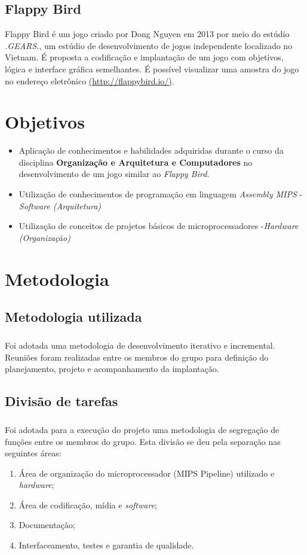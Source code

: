 \documentclass[notitlepage]{report}
\begin{document}
\section{Flappy Bird}
{Flappy Bird é um jogo criado por Dong Nguyen em 2013 por meio do estúdio \textit{.GEARS.}, um estúdio de desenvolvimento de jogos independente localizado no Vietnam. \cite{FBIRD14} É proposta a codificação e implantação de um jogo com objetivos, lógica e interface gráfica semelhantes. É possível visualizar uma amostra do jogo no endereço eletrônico \url{(http://flappybird.io/)}.



\chapter{Objetivos}
\begin {itemize}
\item Aplicação de conhecimentos e habilidades adquiridas durante o curso da disciplina \textbf{Organização e Arquitetura e Computadores} no desenvolvimento de um jogo similar ao \textit {Flappy Bird}.
\item Utilização de conhecimentos de programação em linguagem \textit{Assembly MIPS} - \textit{Software (Arquitetura)}
\item Utilização de conceitos de projetos básicos de microprocessadores -\textit{Hardware (Organização)}
\end{itemize}

\chapter{Metodologia}
\section{Metodologia utilizada}
\paragraph{}{}
{Foi adotada uma metodologia de desenvolvimento iterativo e incremental. Reuniões foram realizadas entre os membros do grupo para definição do planejamento, projeto e acompanhamento da implantação.}
\section{Divisão de tarefas}
\paragraph{}{}
{Foi adotada para a execução do projeto uma metodologia de segregação de funções entre os membros do grupo. Esta divisão se deu pela separação nas seguintes áreas:}
\begin{enumerate}
\item Área de organização do microprocessador (MIPS Pipeline) utilizado e \textit{hardware};
\item Área de codificação, mídia e \textit{software};
\item Documentação;
\item Interfaceamento, testes e garantia de qualidade.
\end{enumerate}




}
\end{document}
